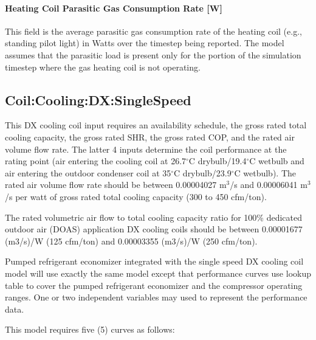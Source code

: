 \paragraph{Heating Coil Parasitic Gas Consumption Rate {[}W{]}}\label{heating-coil-parasitic-gas-consumption-rate-w}

This field is the average parasitic gas consumption rate of the heating coil (e.g., standing pilot light) in Watts over the timestep being reported. The model assumes that the parasitic load is present only for the portion of the simulation timestep where the gas heating coil is not operating.

\subsection{Coil:Cooling:DX:SingleSpeed}\label{coilcoolingdxsinglespeed}

This DX cooling coil input requires an availability schedule, the gross rated total cooling capacity, the gross rated SHR, the gross rated COP, and the rated air volume flow rate. The latter 4 inputs determine the coil performance at the rating point (air entering the cooling coil at 26.7$^\circ$C drybulb/19.4$^\circ$C wetbulb and air entering the outdoor condenser coil at 35$^\circ$C drybulb/23.9$^\circ$C wetbulb). The rated air volume flow rate should be between 0.00004027 m\(^{3}\)/s and 0.00006041 m\(^{3}\)/s per watt of gross rated total cooling capacity (300 to 450 cfm/ton).

The rated volumetric air flow to total cooling capacity ratio for 100\% dedicated outdoor air (DOAS) application DX cooling coils should be between 0.00001677 (m3/s)/W (125 cfm/ton) and 0.00003355 (m3/s)/W (250 cfm/ton).

Pumped refrigerant economizer integrated with the single speed DX cooling coil model will use exactly the same model except that performance curves use lookup table to cover the pumped refrigerant economizer and the compressor operating ranges. One or two independent variables may used to represent the performance data.

This model requires five (5) curves as follows:

